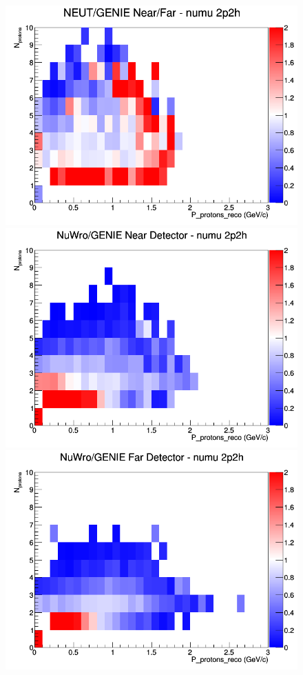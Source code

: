 \begin{figure}[h]
\endminipage
{}
\includegraphics[width=\linewidth]{eff_N_P/GAr/protons/ratios/2p2h_NEUT_GENIE_numu_NF_N_P.png}
\endminipage
\newline
{}
\includegraphics[width=\linewidth]{eff_N_P/GAr/protons/ratios/2p2h_NuWro_GENIE_numu_near_N_P.png}
\endminipage
{}
\includegraphics[width=\linewidth]{eff_N_P/GAr/protons/ratios/2p2h_NuWro_GENIE_numu_far_N_P.png}

\end{figure}
